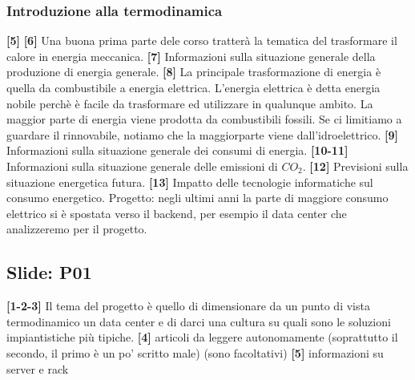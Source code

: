 \subsubsection*{Introduzione alla termodinamica}
\textbf{[5]}\;\newline
\textbf{[6]}\; Una buona prima parte dele corso tratterà la tematica del trasformare il calore in energia meccanica.\newline
\textbf{[7]}\; Informazioni sulla situazione generale della produzione di energia generale.\newline
\textbf{[8]}\; La principale trasformazione di energia è quella da combustibile a energia elettrica. L'energia elettrica è detta energia nobile perchè è facile da trasformare ed utilizzare in qualunque ambito. La maggior parte di energia viene prodotta da combustibili fossili. Se ci limitiamo a guardare il rinnovabile, notiamo che la maggiorparte viene dall'idroelettrico.\newline
\textbf{[9]}\; Informazioni sulla situazione generale dei consumi di energia.\newline
\textbf{[10-11]}\; Informazioni sulla situazione generale delle emissioni di $CO_2$.\newline
\textbf{[12]}\; Previsioni sulla situazione energetica futura.\newline
\textbf{[13]}\; Impatto delle tecnologie informatiche sul consumo energetico. Progetto: negli ultimi anni la parte di maggiore consumo elettrico si è spostata verso il backend, per esempio il data center che analizzeremo per il progetto.
\subsection*{Slide: P01}
\textbf{[1-2-3]}\; Il tema del progetto è quello di dimensionare da un punto di vista termodinamico un data center e di darci una cultura su quali sono le soluzioni impiantistiche più tipiche.\newline
\textbf{[4]}\; articoli da leggere autonomamente (soprattutto il secondo, il primo è un po' scritto male) (sono facoltativi)\newline
\textbf{[5]}\; informazioni su server e rack